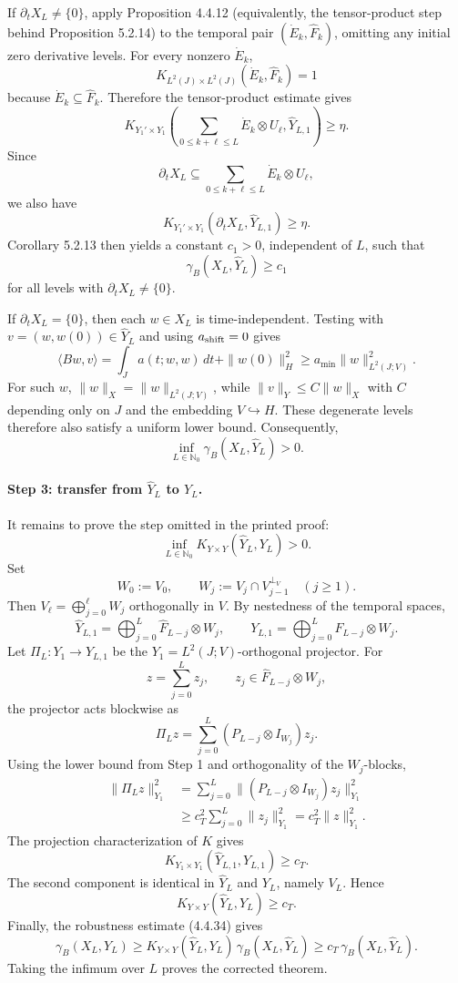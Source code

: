 \documentclass[11pt]{article}
\theoremstyle{definition}
\newcommand{\Nzero}{\mathbb N_0}
\newcommand{\dd}{\partial_t}
\newcommand{\Ltwo}{L^2(J)}
\newcommand{\K}{K}
\newcommand{\gam}{\gamma_B}
\newcommand{\hatF}{\widehat F}
\newcommand{\dotE}{\dot E}
\newcommand{\hatY}{\widehat Y}
\newcommand{\ip}[2]{\langle #1,#2\rangle}
\begin{document}
If \(\dd X_L\ne\{0\}\), apply Proposition 4.4.12 (equivalently, the tensor-product step behind Proposition 5.2.14) to the temporal pair \((\dotE_k,\hatF_k)\), omitting any initial zero derivative levels.  For every nonzero \(\dotE_k\),
\[
  \K_{\Ltwo\times\Ltwo}(\dotE_k,\hatF_k)=1
\]
because \(\dotE_k\subseteq\hatF_k\).  Therefore the tensor-product estimate gives
\[
  \K_{Y_1'\times Y_1}
  \left(
    \sum_{0\le k+\ell\le L}\dotE_k\otimes U_\ell,
    \hatY_{L,1}
  \right)
  \ge \eta .
\]
Since
\[
  \dd X_L\subseteq \sum_{0\le k+\ell\le L}\dotE_k\otimes U_\ell,
\]
we also have
\[
  \K_{Y_1'\times Y_1}(\dd X_L,\hatY_{L,1})\ge \eta .
\]
Corollary 5.2.13 then yields a constant \(c_1>0\), independent of \(L\), such that
\[
  \gam(X_L,\hatY_L)\ge c_1
\]
for all levels with \(\dd X_L\ne\{0\}\).

If \(\dd X_L=\{0\}\), then each \(w\in X_L\) is time-independent.  Testing with \(v=(w,w(0))\in\hatY_L\) and using \(a_{\rm shift}=0\) gives
\[
  \ip{Bw}{v}
  =\int_J a(t;w,w)\,dt+\|w(0)\|_H^2
  \ge a_{\min}\|w\|_{L^2(J;V)}^2.
\]
For such \(w\), \(\|w\|_X=\|w\|_{L^2(J;V)}\), while \(\|v\|_Y\le C\|w\|_X\) with \(C\) depending only on \(J\) and the embedding \(V\hookrightarrow H\).  These degenerate levels therefore also satisfy a uniform lower bound.  Consequently,
\[
  \inf_{L\in\Nzero}\gam(X_L,\hatY_L)>0 .
\]

\paragraph{Step 3: transfer from \(\hatY_L\) to \(Y_L\).}
It remains to prove the step omitted in the printed proof:
\[
  \inf_{L\in\Nzero}\K_{Y\times Y}(\hatY_L,Y_L)>0 .
\]
Set
\[
  W_0:=V_0,
  \qquad
  W_j:=V_j\cap V_{j-1}^{\perp_V}\quad (j\ge1).
\]
Then \(V_\ell=\bigoplus_{j=0}^\ell W_j\) orthogonally in \(V\).  By nestedness of the temporal spaces,
\[
  \hatY_{L,1}=\bigoplus_{j=0}^L \hatF_{L-j}\otimes W_j,
  \qquad
  Y_{L,1}=\bigoplus_{j=0}^L F_{L-j}\otimes W_j .
\]
Let \(\Pi_L:Y_1\to Y_{L,1}\) be the \(Y_1=L^2(J;V)\)-orthogonal projector.  For
\[
  z=\sum_{j=0}^L z_j,
  \qquad
  z_j\in\hatF_{L-j}\otimes W_j,
\]
the projector acts blockwise as
\[
  \Pi_L z=\sum_{j=0}^L (P_{L-j}\otimes I_{W_j})z_j .
\]
Using the lower bound from Step 1 and orthogonality of the \(W_j\)-blocks,
\[
\begin{aligned}
  \|\Pi_L z\|_{Y_1}^2
  &=\sum_{j=0}^L
    \|(P_{L-j}\otimes I_{W_j})z_j\|_{Y_1}^2  \\
  &\ge c_T^2\sum_{j=0}^L\|z_j\|_{Y_1}^2
   =c_T^2\|z\|_{Y_1}^2 .
\end{aligned}
\]
The projection characterization of \(K\) gives
\[
  \K_{Y_1\times Y_1}(\hatY_{L,1},Y_{L,1})\ge c_T .
\]
The second component is identical in \(\hatY_L\) and \(Y_L\), namely \(V_L\).  Hence
\[
  \K_{Y\times Y}(\hatY_L,Y_L)\ge c_T .
\]
Finally, the robustness estimate (4.4.34) gives
\[
  \gam(X_L,Y_L)
  \ge \K_{Y\times Y}(\hatY_L,Y_L)\,\gam(X_L,\hatY_L)
  \ge c_T\,\gam(X_L,\hatY_L).
\]
Taking the infimum over \(L\) proves the corrected theorem.
\end{document}
